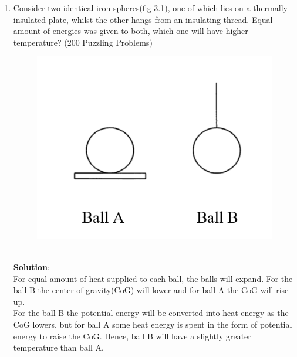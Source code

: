 \begin{enumerate}
    \item Consider two identical iron spheres(fig 3.1), one of which lies on a thermally insulated plate, whilst the other hangs from an insulating thread. Equal amount of energies was given to both, which one will have higher temperature? (200 Puzzling Problems)\\
    \begin{figure}[htp]
        \centering
        \includegraphics{mainmatter/thermo3.1.PNG}
        \caption{}
        \label{fig:thermo3.1}
    \end{figure}
\\
\textbf{Solution}:\\
    For equal amount of heat supplied to each ball, the balls will expand. For the ball B the center of gravity(CoG) will lower and for ball A the CoG will rise up. \\
    For the ball B the potential energy will be converted into heat energy as the CoG lowers, but for ball A some heat energy is spent in the form of potential energy to raise the CoG. Hence, ball B will have a slightly greater temperature than ball A.


\end{enumerate}
